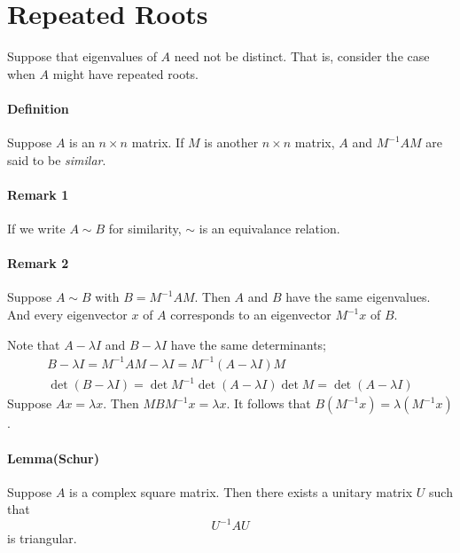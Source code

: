 \documentclass{article}
\begin{document}
%
\section{Repeated Roots}
Suppose that eigenvalues of $A$ need not be distinct.
That is, consider the case when $A$ might have repeated roots.

\paragraph{Definition}
Suppose $A$ is an $n\times n$ matrix.
If  $M$ is another $n\times n$ matrix, $A$ and $M^{-1}AM$ are said to be \emph{similar}.

\paragraph{Remark 1}
If we write $A\sim B$ for similarity, $\sim$ is an equivalance relation.

\paragraph{Remark 2}
Suppose $A\sim B$ with $B=M^{-1}AM$.
Then $A$ and $B$ have the same eigenvalues.
And every eigenvector $x$ of $A$ corresponds to an eigenvector $M^{-1}x$ of $B$.

\medskip
Note that $A-\lambda I$ and $B-\lambda I$ have the same determinants;
\begin{gather*}
B-\lambda I=M^{-1}AM-\lambda I=M^{-1}(A-\lambda I)M\\
\det(B-\lambda I)=\det M^{-1}\det(A-\lambda I)\det M=\det(A-\lambda I)
\end{gather*}
Suppose $Ax=\lambda x$.
Then $MBM^{-1}x=\lambda x$.
It follows that $B(M^{-1}x)=\lambda(M^{-1}x)$.

\paragraph{Lemma(Schur)}
Suppose $A$ is a complex square matrix.
Then there exists a unitary matrix $U$ such that
$$U^{-1}AU$$
is triangular.
\end{document}
